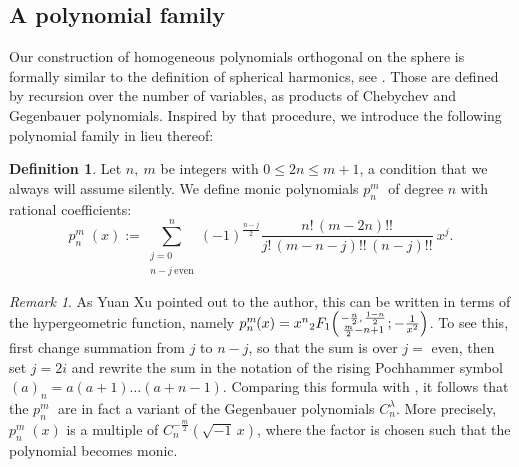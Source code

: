 \documentclass{amsart}
\newcommand{\p}[2]{p_{#1}^{#2}\;\!\!}
\newcommand{\coloneqq}{:=}
\theoremstyle{plain}
\theoremstyle{definition}
\newtheorem{definition}[theorem]{Definition}
\theoremstyle{remark}
\newtheorem{remark}[theorem]{Remark}
\begin{document}
\subsection{A polynomial family} 
Our construction of homogeneous polynomials orthogonal on the sphere is formally similar to the definition of spherical harmonics, see \cite[p.~35]{Dunkl}. Those are defined by recursion over the number of variables, as products of Chebychev and Gegenbauer polynomials. Inspired by that procedure, we introduce the following polynomial family in lieu thereof:
\begin{definition} Let $n,\ m$ be integers with $0\leq 2n\leq m+1$, a condition that we always will assume silently. We define monic polynomials $\p{n}{m}$ of degree $n$ with rational coefficients:
\begin{equation*}
\p{n}{m}(x) \coloneqq \sum_{\substack{j=0\\ n-j\ \text{even}}}^n (-1)^{\frac{n-j}{2}} \frac{n!\,(m-2n)!!}{j!\,(m-n-j)!!\,(n-j)!!}\:x^j.
\end{equation*}
\end{definition}
\begin{remark}
As Yuan Xu pointed out to the author, this can be written in terms of the hypergeometric function, namely $\p{n}{m}(x) = x^n\vphantom{}_2F_1\!\left( \genfrac{}{}{0pt}{}{-\frac{n}{2},\,\frac{1-n}{2}}{\frac{m}{2}-n+1} ; -\frac{1}{x^2}\right)$. To see this, first change summation from $j$ to $n-j$, so that the sum is over $j\! =$ even, then set $j\! =\!2i$ and rewrite the sum in the notation of the rising Pochhammer symbol $(a)_n = a (a\!+\!1)\ldots(a\!+\!n\!-\!1)$. Comparing this formula with \cite[Prop.~1.4.11]{Dunkl}, it follows that the $\p{n}{m}$ are in fact a variant of the Gegenbauer polynomials $C_n^\lambda$. More precisely, $\p{n}{m}(x)$ is a multiple of $C^{-\frac{m}{2}}_n\!\!\left(\sqrt{-1}\,x\right)$, where the factor is chosen such that the polynomial becomes monic.
\end{remark}
\end{document}
